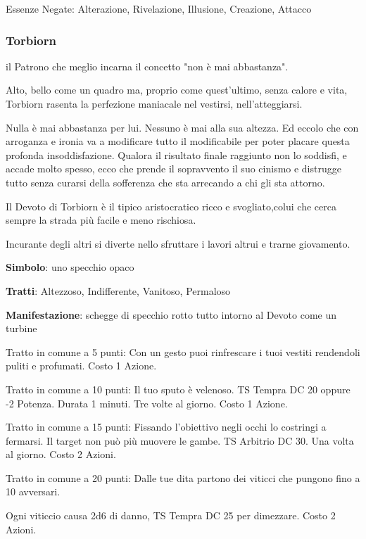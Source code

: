 \documentclass[a4paper,11pt,twoside,openany]{book}
\begin{document}
{Essenze Negate: Alterazione, Rivelazione, Illusione, Creazione, Attacco

\subsubsection{Torbiorn}

\label{torbiorn}

il Patrono che meglio incarna il concetto "non è mai abbastanza".

Alto, bello come un quadro ma, proprio come quest'ultimo, senza calore e vita, Torbiorn rasenta la perfezione maniacale nel vestirsi, nell'atteggiarsi.

Nulla è mai abbastanza per lui. Nessuno è mai alla sua altezza. Ed eccolo che con arroganza e ironia va a modificare tutto il modificabile per poter placare questa profonda insoddisfazione. Qualora il risultato finale raggiunto non lo soddisfi, e accade molto spesso, ecco che prende il sopravvento il suo cinismo e distrugge tutto senza curarsi della sofferenza che sta arrecando a chi gli sta attorno.

Il Devoto di Torbiorn è il tipico aristocratico ricco e svogliato,colui che cerca sempre la strada più facile e meno rischiosa.

Incurante degli altri si diverte nello sfruttare i lavori altrui e trarne giovamento.

\textbf{Simbolo}: uno specchio opaco

\textbf{Tratti}: Altezzoso, Indifferente, Vanitoso, Permaloso

\textbf{Manifestazione}: schegge di specchio rotto tutto intorno al Devoto come un turbine

\bigskip

Tratto in comune a 5 punti: Con un gesto puoi rinfrescare i tuoi vestiti rendendoli puliti e profumati. Costo 1 Azione.

Tratto in comune a 10 punti: Il tuo sputo è velenoso. TS Tempra DC 20 oppure -2 Potenza. Durata 1 minuti. Tre volte al giorno. Costo 1 Azione.

Tratto in comune a 15 punti: Fissando l'obiettivo negli occhi lo costringi a fermarsi. Il target non può più muovere le gambe. TS Arbitrio DC 30. Una volta al giorno. Costo 2 Azioni.

Tratto in comune a 20 punti: Dalle tue dita partono dei viticci che pungono fino a 10 avversari.

Ogni viticcio causa 2d6 di danno, TS Tempra DC 25 per dimezzare. Costo 2 Azioni.

}
\end{document}
